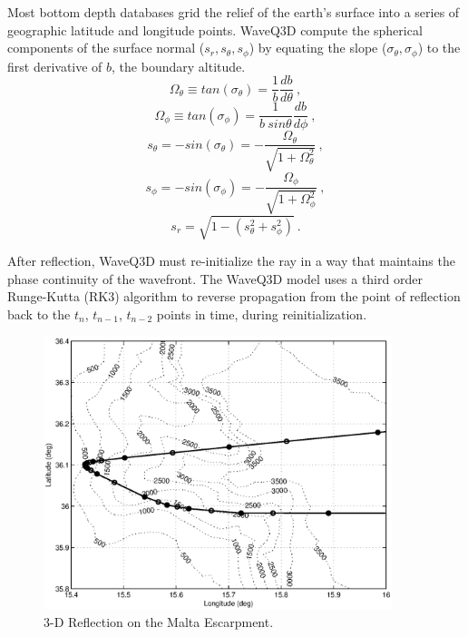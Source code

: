 \documentclass{ws-jca}
\begin{document}
Most bottom depth databases grid the relief of the earth's surface into a
series of geographic latitude and longitude points. WaveQ3D compute the spherical components of the
surface normal (\( s_r, s_\theta, s_\phi\)) by equating the
slope (\(\sigma_\theta, \sigma_\phi\)) to the first derivative of $b$, the
boundary altitude.
\begin{equation}
	\Omega_\theta \equiv tan(\sigma_\theta) 
		= \frac{1}{b} \frac{db}{d\theta} \:,
	\label{eq:slope_theta}
\end{equation}
\begin{equation}
	\Omega_\phi \equiv tan(\sigma_\phi) 
		= \frac{1}{b \: sin\theta} \frac{db}{d\phi} \:,
	\label{eq:slope_phi}
\end{equation}
\begin{equation}
	s_\theta = - sin(\sigma_\theta) 
		= -\frac{\Omega_\theta}{ \sqrt{1+\Omega^2_\theta} } \:,
	\label{eq:normal_theta}
\end{equation}
\begin{equation}
	s_\phi = - sin(\sigma_\phi) 
		= -\frac{\Omega_\phi}{ \sqrt{1+\Omega^2_\phi} } \:,
	\label{eq:normal_phi}
\end{equation}
\begin{equation}
	s_r = \sqrt{ 1- ( s^2_\theta + s^2_\phi )} \:.
	\label{eq:normal_r}
\end{equation}

After reflection, WaveQ3D must re-initialize the ray in a way that maintains the
phase continuity of the wavefront. The WaveQ3D model uses a third order
Runge-Kutta (RK3) algorithm to reverse propagation from the point of
reflection back to the \(t_n\), \(t_{n-1}\), \(t_{n-2}\) points in time, during reinitialization.

\begin{figure}[th]
	\centerline{\includegraphics[width=4in]{reflect_grid_malta.eps}} 
	\vspace*{8pt}
	\caption{3-D Reflection on the Malta Escarpment.
	\label{fig:reflect_grid_malta}}
\end{figure}
\end{document}
